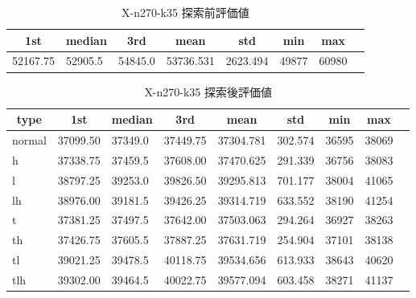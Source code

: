 \begin{table}[htbp]
    \caption{X-n270-k35 探索前評価値}
    \begin{tabular}{|l|l|l|l|l|l|l|l|}\hline
    \multicolumn{1}{|c|}{\textbf{1st}}
    &\multicolumn{1}{c|}{\textbf{median}}
    &\multicolumn{1}{c|}{\textbf{3rd}}
    &\multicolumn{1}{c|}{\textbf{mean}}
    &\multicolumn{1}{c|}{\textbf{std}}
    &\multicolumn{1}{c|}{\textbf{min}}
    &\multicolumn{1}{c|}{\textbf{max}}\\\hline
	52167.75 & 52905.5 & 54845.0 & 53736.531 & 2623.494 & 49877 & 60980\\\hline
	\end{tabular}
\end{table}
\begin{table}[htbp]
    \caption{X-n270-k35 探索後評価値}
    \begin{tabular}{|l|l|l|l|l|l|l|l|l|}\hline
    \multicolumn{1}{|c|}{\textbf{type}}
    &\multicolumn{1}{|c|}{\textbf{1st}}
    &\multicolumn{1}{c|}{\textbf{median}}
    &\multicolumn{1}{c|}{\textbf{3rd}}
    &\multicolumn{1}{c|}{\textbf{mean}}
    &\multicolumn{1}{c|}{\textbf{std}}
    &\multicolumn{1}{c|}{\textbf{min}}
    &\multicolumn{1}{c|}{\textbf{max}}\\\hline
	normal & 37099.50 & 37349.0 & 37449.75 & 37304.781 & 302.574 & 36595 & 38069\\\hline
	h & 37338.75 & 37459.5 & 37608.00 & 37470.625 & 291.339 & 36756 & 38083\\\hline
	l & 38797.25 & 39253.0 & 39826.50 & 39295.813 & 701.177 & 38004 & 41065\\\hline
	lh & 38976.00 & 39181.5 & 39426.25 & 39314.719 & 633.552 & 38190 & 41254\\\hline
	t & 37381.25 & 37497.5 & 37642.00 & 37503.063 & 294.264 & 36927 & 38263\\\hline
	th & 37426.75 & 37605.5 & 37887.25 & 37631.719 & 254.904 & 37101 & 38138\\\hline
	tl & 39021.25 & 39478.5 & 40118.75 & 39534.656 & 613.933 & 38643 & 40620\\\hline
	tlh & 39302.00 & 39464.5 & 40022.75 & 39577.094 & 603.458 & 38271 & 41137\\\hline
	\end{tabular}
\end{table}
